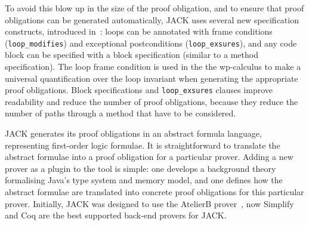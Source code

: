 
To avoid this blow up in the size of the proof obligation, and to
ensure that proof obligations can be generated automatically, JACK
uses several new specification constructs, introduced
in~\cite{BurdyRL03}: loops can be annotated with frame conditions
(\texttt{loop\_modifies}) and exceptional postconditions
(\texttt{loop\_exsures}), and any code block can be specified with a
block specification (similar to a method specification). The loop
frame condition is used in the the wp-calculus to make a universal
quantification over the loop invariant when generating the appropriate
proof obligations. Block specifications and
\texttt{loop\_exsures} clauses improve readability and reduce the
number of proof obligations, because they reduce the number of paths
through a method that have to be considered.


JACK generates its proof obligations in an abstract formula language,
representing first-order logic formulae. It is straightforward to
translate the abstract formulae into a proof obligation for a
particular prover. Adding a new prover as a plugin to the tool is
simple: one develops a background theory formalising Java's type
system and memory model, and one defines how the abstract formulae are
translated into concrete proof obligations for this particular
prover. Initially, JACK was designed to use the AtelierB
prover~\cite{Abrial96}, now Simplify and Coq are the best
supported back-end provers for JACK.




